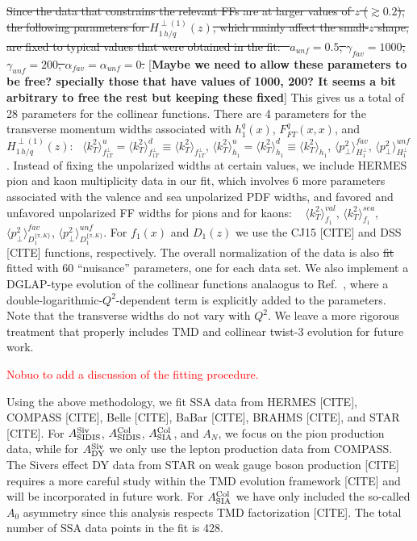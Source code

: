 \documentclass[twocolumn,prl,aps,superscriptaddress
               ,footinbib,amsfonts,amsmath,amssymb,showpacs]{revtex4-1}
\def\kT{k_T}
\def\pperp{p_\perp}
\def\avkT{\la \kT^2 \ra}
\def\avpperp{\la \pperp^2 \ra}
\newcommand{\la}{\langle}
\newcommand{\ra}{\rangle}
\newcommand{\rep}[2]{{\color{blue} \st{#1}} {\color{red} #2}}
\newcommand{\com}[1]{{\color{red} [\textbf{#1}]}}
\newcommand{\old}[1]{{\color{red}\sout{#1}}}
\begin{document}
\old{Since the data that constrains the relevant FFs are at larger values
of $z$ ($\gtrsim 0.2$), the following parameters for 
$H_{1\,h/q}^{\perp (1)}(z)$, which mainly affect the small-$z$ shape, are
fixed to typical values that were obtained in the fit:
    ~$a_{unf}=0.5$, 
     $\gamma_{fav}=1000$,
     $\gamma_{unf}=200$, 
     $\alpha_{fav}=\alpha_{unf}=0$.}
\com{Maybe we need to allow these parameters to be free? specially
those that have values of 1000, 200? It seems a bit arbitrary to 
free the rest but keeping these fixed}
%
This gives us a total of 28 parameters for the collinear functions.  
There are 4 parameters for the transverse momentum widths associated with
$h_1^q(x)$, $F_{FT}^q(x,x)$, and  $H_{1 \,h/q}^{\perp (1)}(z)$:~
    $\avkT^{u}_{f_{1T}^\perp}=\avkT^{d}_{f_{1T}^\perp}
                              \equiv\avkT_{f_{1T}^\perp}$, 
    $\avkT_{h_1}^u=\avkT_{h_1}^d\equiv \avkT_{h_1}$, 
    $\avpperp^{fav}_{H_1^\perp}$,
    $\avpperp^{unf}_{H_1^\perp}$.  
%
Instead of fixing the unpolarized widths at certain values, we include
HERMES pion and kaon multiplicity data in our fit, which involves 6
more parameters associated with the valence and sea unpolarized PDF
widths, and favored and unfavored unpolarized FF widths for pions and
for kaons:
  ~ $\avkT^{val}_{f_1}$,
    $\avkT^{sea}_{f_1}$, 
    $\avpperp^{fav}_{D_1^{\{\pi,K\}}}$,
    $\avpperp^{unf}_{D_1^{\{\pi,K\}}}$.  
For $f_1(x)$ and $D_1(z)$ we use the CJ15 [CITE] and DSS [CITE]
functions, respectively.  
%
The overall normalization of the data is also \rep{fit}{fitted} with
60 ``nuisance'' parameters, one for each data set.  
%
We also implement a DGLAP-type evolution of the collinear functions
analaogus to Ref.~\cite{Duke:1983gd}, where a
double-logarithmic-$Q^2$-dependent term is explicitly added to the
parameters.  
%
Note that the transverse widths do not vary with $Q^2$.
We leave a more rigorous treatment that properly includes TMD and
collinear twist-3 evolution for future work.

\textcolor{red}{Nobuo to add a discussion of the fitting procedure.}

\vspace{0.1cm}
%
Using the above methodology, we fit SSA data from HERMES [CITE],
COMPASS [CITE], Belle [CITE], BaBar [CITE], BRAHMS [CITE], and STAR
[CITE].  
%
For $A_{\rm SIDIS}^{\rm Siv}$, 
    $A_{\rm SIDIS}^{\rm Col}$,
    $A_{\rm SIA}^{\rm Col}$, and $A_N$, 
we focus on the pion production data, while for $A_{\rm DY}^{\rm Siv}$
we only use the lepton production data from COMPASS.  
%
The Sivers effect DY data from STAR on weak gauge boson production
[CITE] requires a more careful study within the TMD evolution
framework [CITE] and will be incorporated in future work.  
%
For $A_{\rm SIA}^{\rm Col}$ we have only included the so-called $A_0$
asymmetry since this analysis respects TMD factorization [CITE].  
%
The total number of SSA data points in the fit is 428.
\end{document}
